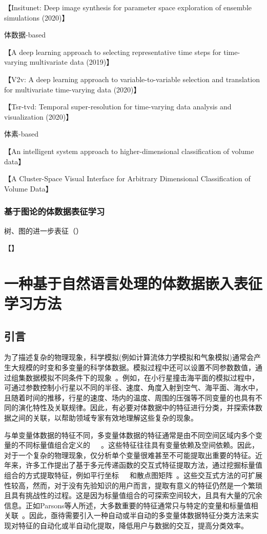 【Insitunet: Deep image synthesis for parameter space exploration of ensemble simulations (2020)】

体数据-based

【A deep learning approach to selecting representative time steps for time-varying multivariate data (2019)】

【V2v: A deep learning approach to variable-to-variable selection and translation for multivariate time-varying data (2020)】

【Tsr-tvd: Temporal super-resolution for time-varying data analysis and visualization (2020)】

体素-based

【An intelligent system approach to higher-dimensional classification of volume data】

【A Cluster-Space Visual Interface for Arbitrary Dimensional Classification of Volume Data】


\subsection{基于图论的体数据表征学习}

树、图的进一步表征（）

【】


\chapter{一种基于自然语言处理的体数据嵌入表征学习方法}

\section{引言}

为了描述复杂的物理现象，科学模拟(例如计算流体力学模拟和气象模拟)通常会产生大规模的时变和多变量的科学体数据。模拟过程中还可以设置不同参数数值，通过组集数据模拟不同条件下的现象~\cite{BURCKNER:2010:RDE}。例如，在小行星撞击海平面的模拟过程中，可通过参数控制小行星以不同的半径、速度、角度入射到空气、海平面、海水中，且随着时间的推移，行星的速度、场内的温度、周围的压强等不同变量的也具有不同的演化特性及关联规律。因此，有必要对体数据中的特征进行分类，并探索体数据之间的关联，以帮助领域专家有效地理解这些复杂的现象。

与单变量体数据的特征不同，多变量体数据的特征通常是由不同空间区域内多个变量的不同标量值组合定义的~\cite{GUO:2012:SMV}~\cite{LIU:2015:AAF}~\cite{LU:2017:MVD}。这些特征往往具有变量依赖及空间依赖。因此，对于一个复杂的物理现象，仅分析单个变量很难甚至不可能提取出重要的特征。近年来，许多工作提出了基于多元传递函数的交互式特征提取方法，通过挖掘标量值组合的方式提取特征，例如平行坐标~\cite{Inselberg:1985:TPW}~\cite{GUO:2011:MTF}~\cite{GUO:2012:SMV}和散点图矩阵~\cite{LIU:2015:AAF}。这些交互式方法的可扩展性较高，然而，对于没有先验知识的用户而言，提取有意义的特征仍然是一个繁琐且具有挑战性的过程。这是因为标量值组合的可探索空间较大，且具有大量的冗余信息。正如Parsons等人所述，大多数重要的特征通常只与特定的变量和标量值相关联~\cite{PAR:2004:SCF}。因此，亟待需要引入一种自动或半自动的多变量体数据特征分类方法来实现对特征的自动化或半自动化提取，降低用户与数据的交互，提高分类效率。

